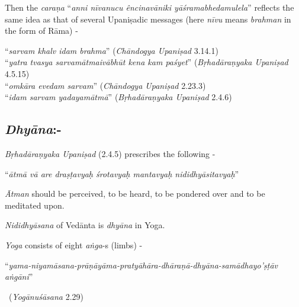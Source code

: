 Then the \textit{caraṇa} “\textit{anni nīvanucu êncinavāniki yāśramabhedamulela}” reflects the same idea as that of several Upaniṣadic messages (here \textit{nīvu} means \textit{brahman} in the form of Rāma) -

\begin{myquote}
“\textit{sarvam khalv idam brahma}” (\textit{Chāndogya Upaniṣad} 3.14.1)\\ “\textit{yatra tvasya sarvamātmaivābhūt kena kam paśyet}” (\textit{Bṛhadāraṇyaka Upaniṣad} 4.5.15)\\ “\textit{omkāra evedam sarvam}” (\textit{Chāndogya Upaniṣad} 2.23.3)\\ “\textit{idam sarvam yadayamātmā}” (\textit{Bṛhadāraṇyaka Upaniṣad} 2.4.6)
\end{myquote}


\subsection*{\textit{Dhyāna}:-}

\textit{Bṛhadāraṇyaka Upaniṣad} (2.4.5) prescribes the following -

\begin{myquote}
“\textit{ātmā vā are draṣṭavyaḥ śrotavyaḥ mantavyaḥ nididhyāsitavyaḥ}”
\end{myquote}

\textit{Ātman} should be perceived, to be heard, to be pondered over and to be meditated upon.

\textit{Nididhyāsana} of Vedānta is \textit{dhyāna} in Yoga.

\textit{Yoga} consists of eight \textit{aṅga}-s (limbs) -

\begin{myquote}
“\textit{yama-niyamāsana-prāṇāyāma-pratyāhāra-dhāraṇā-dhyāna-samādhayo’ṣṭāv aṅgāni}” 

~\hfill (\textit{Yogānuśāsana} 2.29)
\end{myquote}

